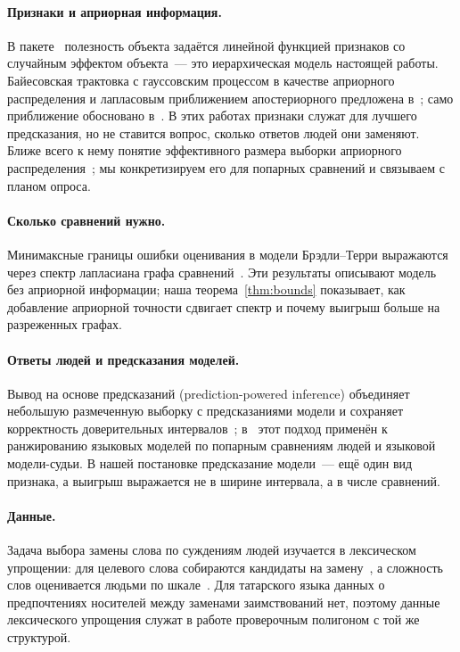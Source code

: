 \documentclass{article}
\theoremstyle{definition}
\theoremstyle{remark}
\begin{document}
\paragraph{Признаки и априорная информация.}
В пакете~\citep{turner2012bradleyterry2} полезность объекта задаётся линейной функцией признаков со случайным эффектом объекта~--- это иерархическая модель настоящей работы. Байесовская трактовка с гауссовским процессом в качестве априорного распределения и лапласовым приближением апостериорного предложена в~\citep{chu2005preference}; само приближение обосновано в~\citep{tierney1986accurate}. В этих работах признаки служат для лучшего предсказания, но не ставится вопрос, сколько ответов людей они заменяют. Ближе всего к нему понятие эффективного размера выборки априорного распределения~\citep{morita2008determining}; мы конкретизируем его для попарных сравнений и связываем с планом опроса.

\paragraph{Сколько сравнений нужно.}
Минимаксные границы ошибки оценивания в модели Брэдли--Терри выражаются через спектр лапласиана графа сравнений~\citep{shah2016estimation}. Эти результаты описывают модель без априорной информации; наша теорема~\ref{thm:bounds} показывает, как добавление априорной точности сдвигает спектр и почему выигрыш больше на разреженных графах.

\paragraph{Ответы людей и предсказания моделей.}
Вывод на основе предсказаний (prediction-powered inference) объединяет небольшую размеченную выборку с предсказаниями модели и сохраняет корректность доверительных интервалов~\citep{angelopoulos2023prediction}; в~\citep{chatzi2024prediction} этот подход применён к ранжированию языковых моделей по попарным сравнениям людей и языковой модели-судьи. В нашей постановке предсказание модели~--- ещё один вид признака, а выигрыш выражается не в ширине интервала, а в числе сравнений.

\paragraph{Данные.}
Задача выбора замены слова по суждениям людей изучается в лексическом упрощении: для целевого слова собираются кандидаты на замену~\citep{paetzold2016benchmarking}, а сложность слов оценивается людьми по шкале~\citep{maddela2018word}. Для татарского языка данных о предпочтениях носителей между заменами заимствований нет, поэтому данные лексического упрощения служат в работе проверочным полигоном с той же структурой.
\end{document}
